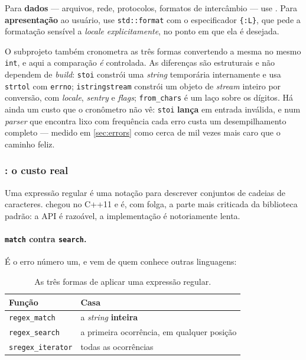 \begin{regra}
Para \textbf{dados} --- arquivos, rede, protocolos, formatos de intercâmbio ---
use . Para \textbf{apresentação} ao usuário, use
\texttt{std::format} com o especificador \texttt{\{:L\}}, que pede a formatação
sensível a \emph{locale} \emph{explicitamente}, no ponto em que ela é desejada.
\end{regra}

O subprojeto também cronometra as três formas convertendo a mesma
 no mesmo \texttt{int}, e aqui a comparação \emph{é}
controlada. As diferenças são estruturais e não dependem de \emph{build}:
\texttt{stoi} constrói uma \emph{string} temporária internamente e usa
\texttt{strtol} com \texttt{errno}; \texttt{istringstream} constrói um objeto de
\emph{stream} inteiro por conversão, com \emph{locale}, \emph{sentry} e
\emph{flags}; \texttt{from\_chars} é um laço sobre os dígitos. Há ainda um custo
que o cronômetro não vê: \texttt{stoi} \textbf{lança} em entrada inválida, e num
\emph{parser} que encontra lixo com frequência cada erro custa um
desempilhamento completo --- medido em \cref{sec:errors} como cerca de mil vezes
mais caro que o caminho feliz.

\subsubsection{: o custo real}
\label{sec:regex}

Uma expressão regular é uma notação para descrever conjuntos de cadeias de
caracteres.  chegou no C++11 e é, com folga, a parte mais
criticada da biblioteca padrão: a API é razoável, a implementação é
notoriamente lenta.

\paragraph{\texttt{match} contra \texttt{search}.} É o erro número um, e vem de
quem conhece outras linguagens:

\begin{table}[htbp]
\centering
\caption{As três formas de aplicar uma expressão regular.}
\label{tab:regex-funcoes}
\footnotesize
\begin{tabular}{@{}ll@{}}
\toprule
\textbf{Função} & \textbf{Casa} \\
\midrule
\texttt{regex\_match}     & a \emph{string} \textbf{inteira} \\
\texttt{regex\_search}    & a primeira ocorrência, em qualquer posição \\
\texttt{sregex\_iterator} & todas as ocorrências \\
\bottomrule
\end{tabular}
\end{table}

